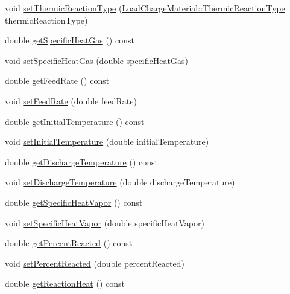 \begin{DoxyCompactItemize}
\item 
void \hyperlink{class_gas_load_charge_material_ac48eb07a3008f1dc0ff433353b59536d}{set\+Thermic\+Reaction\+Type} (\hyperlink{namespace_load_charge_material_a51d4263e865a5d86236622dd3fe23fd1}{Load\+Charge\+Material\+::\+Thermic\+Reaction\+Type} thermic\+Reaction\+Type)
\item 
double \hyperlink{class_gas_load_charge_material_a66e956e7a52b1032a3e8a725f26fa580}{get\+Specific\+Heat\+Gas} () const
\item 
void \hyperlink{class_gas_load_charge_material_a07bf6d4ee9161683fbeb3baad16ea7be}{set\+Specific\+Heat\+Gas} (double specific\+Heat\+Gas)
\item 
double \hyperlink{class_gas_load_charge_material_ae14ebe9b7091a491166174968505b6ee}{get\+Feed\+Rate} () const
\item 
void \hyperlink{class_gas_load_charge_material_a922b728dfd109d1c1684d7dfad82ec8e}{set\+Feed\+Rate} (double feed\+Rate)
\item 
double \hyperlink{class_gas_load_charge_material_af8a83c3720d108baa196394105822db7}{get\+Initial\+Temperature} () const
\item 
void \hyperlink{class_gas_load_charge_material_aec9ddfce5e31099b6a047e3d98d80d47}{set\+Initial\+Temperature} (double initial\+Temperature)
\item 
double \hyperlink{class_gas_load_charge_material_a6baaf6ad65e2a3d1fa90b7c007bc3c53}{get\+Discharge\+Temperature} () const
\item 
void \hyperlink{class_gas_load_charge_material_a6c53344d5370a1e9b7321a530a6843c0}{set\+Discharge\+Temperature} (double discharge\+Temperature)
\item 
double \hyperlink{class_gas_load_charge_material_a9a07e86938bb831e51ac3f53f696a3c3}{get\+Specific\+Heat\+Vapor} () const
\item 
void \hyperlink{class_gas_load_charge_material_a7498eba84bb8bdfc5344f0e44418260b}{set\+Specific\+Heat\+Vapor} (double specific\+Heat\+Vapor)
\item 
double \hyperlink{class_gas_load_charge_material_af47b4c6c3e547325cadd81cbb09937ee}{get\+Percent\+Reacted} () const
\item 
void \hyperlink{class_gas_load_charge_material_a7142cb6bbfba53d640dd6f1590fe32f6}{set\+Percent\+Reacted} (double percent\+Reacted)
\item 
double \hyperlink{class_gas_load_charge_material_a605eaf21d1f25f27b53627aeb903c93d}{get\+Reaction\+Heat} () const
\item 

\end{DoxyCompactItemize}
